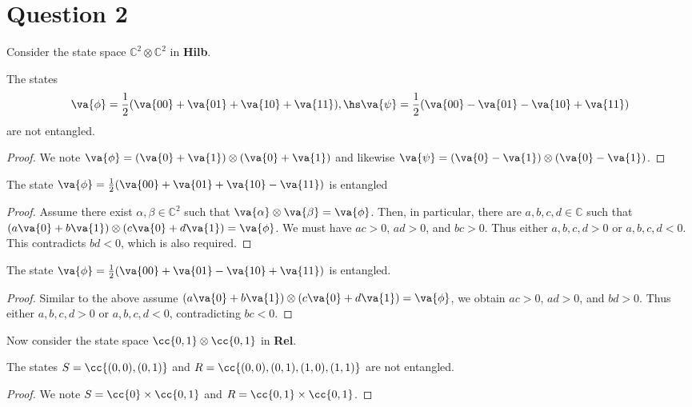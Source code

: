 \documentclass{article}
\begin{document}
\section*{Question 2}

Consider the state space $\mathbb C^2\otimes\mathbb C^2$ in \textbf{Hilb}.

\begin{claim*}
  The states
  \begin{align*}
    \va{\phi}=\frac{1}{2}(\va{00}+\va{01}+\va{10}+\va{11}),\hs
    \va{\psi}=\frac{1}{2}(\va{00}-\va{01}-\va{10}+\va{11})
  \end{align*}
  are not entangled.
  \begin{proof}
    We note $\va{\phi}=(\va{0}+\va{1})\otimes(\va{0}+\va{1})$ and likewise
    $\va{\psi}=(\va{0}-\va{1})\otimes(\va{0}-\va{1})$.
  \end{proof}
\end{claim*}

\begin{claim*}
  The state $\va{\phi}=\frac{1}{2}(\va{00}+\va{01}+\va{10}-\va{11})$ is entangled
  \begin{proof}
    Assume there exist $\alpha,\beta\in\mathbb C^2$ such that
    $\va{\alpha}\otimes\va{\beta}=\va{\phi}$. Then, in particular, there are
    $a,b,c,d\in\mathbb C$ such that $(a\va{0}+b\va{1})\otimes(c\va{0}+d\va{1})=\va{\phi}$.
    We must have $ac>0$, $ad>0$, and $bc>0$. Thus either $a,b,c,d>0$ or $a,b,c,d<0$.
    This contradicts $bd<0$, which is also required.
  \end{proof}
\end{claim*}

\begin{claim*}
  The state $\va{\phi}=\frac{1}{2}(\va{00}+\va{01}-\va{10}+\va{11})$ is entangled.
  \begin{proof}
    Similar to the above assume $(a\va{0}+b\va{1})\otimes(c\va{0}+d\va{1})=\va{\phi}$,
    we obtain $ac>0$, $ad>0$, and $bd>0$. Thus either $a,b,c,d>0$ or $a,b,c,d<0$,
    contradicting $bc<0$.
  \end{proof}
\end{claim*}

Now consider the state space $\cc{0,1}\otimes\cc{0,1}$ in \textbf{Rel}.

\begin{claim*}
  The states $S=\cc{(0,0),(0,1)}$ and $R=\cc{(0,0),(0,1),(1,0),(1,1)}$ are not entangled.
  \begin{proof}
    We note $S=\cc{0}\times\cc{0,1}$ and $R=\cc{0,1}\times\cc{0,1}$.
  \end{proof}
\end{claim*}
\end{document}
